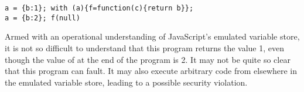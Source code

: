 \documentclass{article}
\begin{document}
% 

\begin{verbatim}
a = {b:1}; with (a){f=function(c){return b}};
a = {b:2}; f(null)
\end{verbatim}

Armed with an operational understanding of JavaScript's emulated variable
store, it is not so difficult to understand that this program returns the value
1, even though the value of  at the end of the program is 2. It may not
be quite so clear that this  program can fault. It
may also  execute arbitrary code from elsewhere in the emulated variable store, leading to a possible security violation. 
\end{document}

